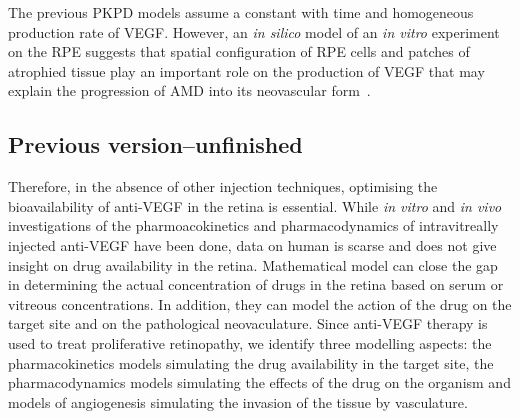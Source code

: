 \documentclass[11pt,a4paper]{article}
\begin{document}
The previous PKPD models assume a constant with time and homogeneous production rate of VEGF.
However, an \textit{in silico} model of an \textit{in vitro} experiment on the RPE suggests that spatial configuration of RPE cells and patches of atrophied tissue play an important role on the production of VEGF that may explain the progression of AMD into its neovascular form~\cite{Baker_2017}.  






\subsection{Previous version--unfinished}

Therefore, in the absence of other injection techniques, optimising the bioavailability of anti-VEGF in the retina is essential.
While \textit{in vitro} and \textit{in vivo} investigations of the pharmoacokinetics and pharmacodynamics of intravitreally injected anti-VEGF have been done, data on human is scarse and does not give insight on drug availability in the retina.
Mathematical model can close the gap in determining the actual concentration of drugs in the retina based on serum or vitreous concentrations.
In addition, they can model the action of the drug on the target site and on the pathological neovaculature.
Since anti-VEGF therapy is used to treat proliferative retinopathy, we identify three modelling aspects: the pharmacokinetics models simulating the drug availability in the target site, the pharmacodynamics models simulating the effects of the drug on the organism and models of angiogenesis simulating the invasion of the tissue by vasculature.
\end{document}
